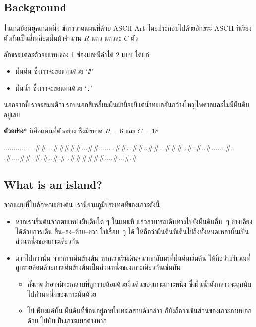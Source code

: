 
\subsection*{\sectionfont\upshape Background}

ในเกมย้อนยุคเกมหนึ่ง มีการวาดแผนที่ด้วย ASCII Art โดยประกอบไปด้วยอักขระ ASCII 
ที่เรียงตัวกันเป็นสี่เหลี่ยมผืนผ้าจำนวน $R$ แถว แถวละ $C$ ตัว

อักขระแต่ละตัวจะแทนช่อง 1 ช่องและมีค่าได้ 2 แบบ ได้แก่
\begin{itemize}
    \item ผืนดิน ซึ่งเราจะขอแทนด้วย `\verb|#|'
    \item ผืนน้ำ ซึ่งเราจะขอแทนด้วย `\verb|.|'
\end{itemize}

นอกจากนี้เราจะสมมติว่า รอบนอกสี่เหลี่ยมผืนผ้านี้จะ\uline{มีแต่น้ำทะเล}อันกว้างใหญ่ไพศาลและ\uline{ไม่มีผืนดิน}อยู่เลย

\bigskip\noindent
\textbf{\uline{ตัวอย่าง}}* นี่คือแผนที่ตัวอย่าง ซึ่งมีขนาด $R = {6}$ และ $C = {18}$
\begin{center}
    \vspace{0.25\baselineskip}
    \begin{centervrb}{18}
\begin{plainvrb}
................##
..#####...##......
.##...##..##...###
.#..#..#.......#..
.#....##..#.#..#.#
.######....#...#.#
\end{plainvrb}
    \end{centervrb}
    \vspace{0.25\baselineskip}
\end{center}

\subsection*{\sectionfont\upshape What is an island?}
จากแผนที่ในลักษณะข้างต้น เรานิยามภูมิประเทศทีของเกาะดังนี้%

\begin{itemize}
\item หากเราเริ่มต้นจากตำแหน่งผืนดินใด ๆ ในแผนที่ แล้วสามารถเดินทางไปยังผืนดินอื่น~ๆ 
    ข้างเคียงได้ด้วยการเดิน ขึ้น--ลง--ซ้าย--ขวา ไปเรื่อย~ๆ ได้ 
    ให้ถือว่าผืนดินที่เดินไปถึงทั้งหมดเหล่านั้นเป็นส่วนหนึ่งของเกาะเดียวกัน
\item มากไปกว่านั้น จากการเดินข้างต้น หากเราเริ่มเดินจนวกกลับมาที่ผืนดินเริ่มต้น 
    ให้ถือว่าบริเวณที่ถูกรายล้อมด้วยการเดินข้างต้นเป็นส่วนหนึ่งของเกาะเดียวกันเช่นกัน
    \begin{itemize}[before*=\small]
    \item สังเกตว่าอาจมีทะเลสาบที่ถูกรายล้อมด้วยผืนดินของเกาะเกาะหนึ่ง 
        ซึ่งผืนน้ำดังกล่าวจะถูกนับไปส่วนหนึ่งของเกาะนั้นด้วย
    \item ไม่เพียงแค่นั้น ผืนดินที่ซ้อนอยู่ภายในทะเลสาบดังกล่าว 
        ก็ยังถือว่าเป็นส่วนของเกาะภายนอกด้วย ไม่นับเป็นเกาะแยกต่างหาก
    \end{itemize}
\end{itemize}

